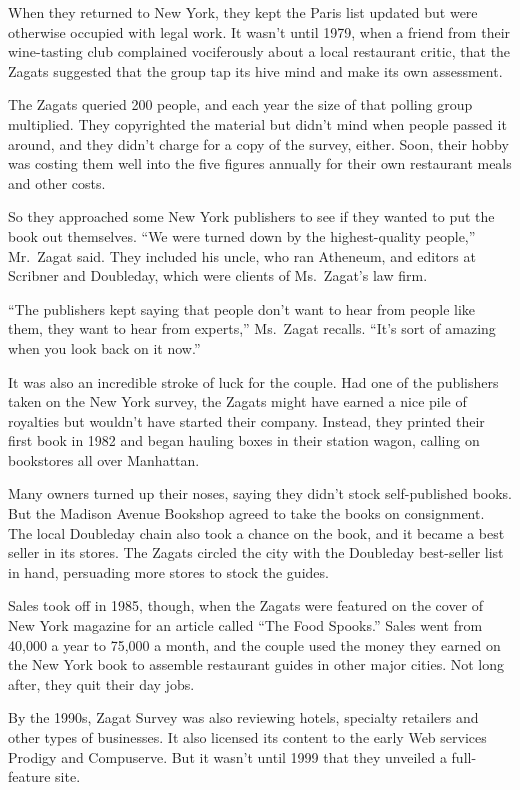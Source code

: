 ﻿\documentclass[12pt]{article}
\begin{document}
When they returned to New York, they kept the Paris list updated but were otherwise occupied with
legal work. It wasn't until 1979, when a friend from their wine-tasting club complained vociferously
about a local restaurant critic, that the Zagats suggested that the group tap its hive mind and make
its own assessment.

The Zagats queried 200 people, and each year the size of that polling group multiplied. They
copyrighted the material but didn't mind when people passed it around, and they didn't charge for a
copy of the survey, either. Soon, their hobby was costing them well into the five figures annually
for their own restaurant meals and other costs.

So they approached some New York publishers to see if they wanted to put the book out themselves.
``We were turned down by the highest-quality people,'' Mr.~Zagat said. They included his uncle, who
ran Atheneum, and editors at Scribner and Doubleday, which were clients of Ms.~Zagat's law firm.

``The publishers kept saying that people don't want to hear from people like them, they want to hear
from experts,'' Ms.~Zagat recalls. ``It's sort of amazing when you look back on it now.''

It was also an incredible stroke of luck for the couple. Had one of the publishers taken on the New
York survey, the Zagats might have earned a nice pile of royalties but wouldn't have started their
company. Instead, they printed their first book in 1982 and began hauling boxes in their station
wagon, calling on bookstores all over Manhattan.

Many owners turned up their noses, saying they didn't stock self-published books. But the Madison
Avenue Bookshop agreed to take the books on consignment. The local Doubleday chain also took a
chance on the book, and it became a best seller in its stores. The Zagats circled the city with the
Doubleday best-seller list in hand, persuading more stores to stock the guides.

Sales took off in 1985, though, when the Zagats were featured on the cover of New York magazine for
an article called ``The Food Spooks.'' Sales went from 40,000 a year to 75,000 a month, and the
couple used the money they earned on the New York book to assemble restaurant guides in other major
cities. Not long after, they quit their day jobs.

By the 1990s, Zagat Survey was also reviewing hotels, specialty retailers and other types of
businesses. It also licensed its content to the early Web services Prodigy and Compuserve. But it
wasn't until 1999 that they unveiled a full-feature site.
\end{document}
